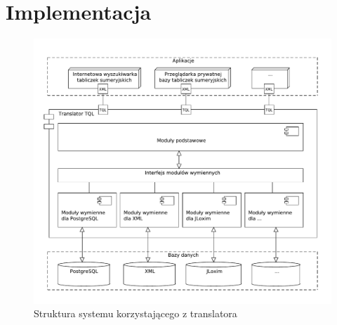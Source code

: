 \chapter{Implementacja}
\begin{figure}[h]
 \centering
 \includegraphics[width=450px,bb=0 0 608 517]{../diagramy/struktura2.pdf}
 \caption{Struktura systemu korzystającego z translatora}
\end{figure}


